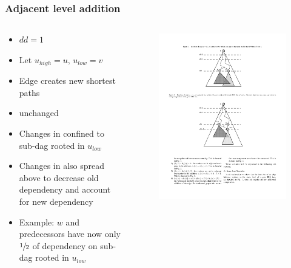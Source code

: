 \begin{frame}
  \frametitle{Adjacent level addition}
  \begin{columns}[onlytextwidth]

    \begin{column}{0.5\textwidth}
      \begin{itemize}
        \item $dd = 1$
        \item Let $u_{high} = u ,\, u_{low} = v$
        \item Edge creates new shortest paths
        \item \spdag unchanged
        \item Changes in \paths confined to sub-dag rooted in $u_{low}$
        \item Changes in \dep also spread above to decrease old dependency and account for new dependency
        \item Example: $w$ and predecessors have now only $\sfrac{1}{2}$ of dependency on sub-dag rooted in $u_{low}$
      \end{itemize}
    \end{column}

    \begin{column}{0.5\textwidth}
      \begin{figure}[t]
        \centering
        \includegraphics[width=\textwidth, height=\textheight, keepaspectratio]{imgs/green-1lvl-compressed}
      \end{figure}
    \end{column}
  \end{columns}

\end{frame}


